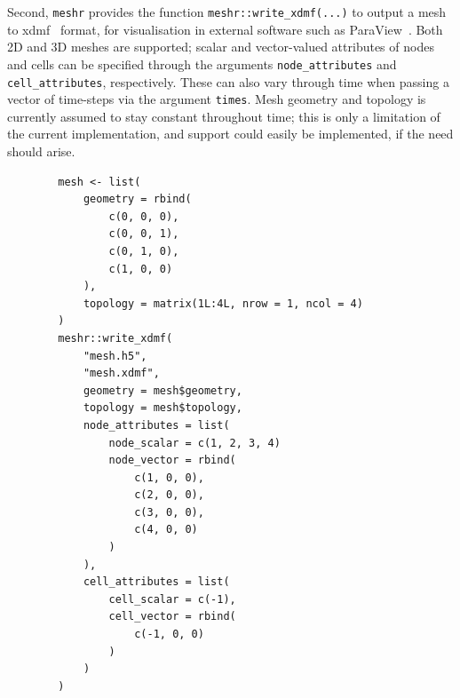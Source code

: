 \documentclass[british]{scrreprt}
\begin{document}
Second, \texttt{meshr} provides the function \texttt{meshr::write_xdmf(...)} to output a mesh to \gls{xdmf}~\cite{XDMF} format, for visualisation in external software such as ParaView~\cite{ParaView}. Both 2D and 3D meshes are supported; scalar and vector-valued attributes of nodes and cells can be specified through the arguments \texttt{node\_attributes} and \texttt{cell\_attributes}, respectively. These can also vary through time when passing a vector of time-steps via the argument \texttt{times}. Mesh geometry and topology is currently assumed to stay constant throughout time; this is only a limitation of the current implementation, and support could easily be implemented, if the need should arise.
\begin{listing}
    \begin{verbatim}
        mesh <- list(
            geometry = rbind(
                c(0, 0, 0),
                c(0, 0, 1),
                c(0, 1, 0),
                c(1, 0, 0)
            ),
            topology = matrix(1L:4L, nrow = 1, ncol = 4)
        )
        meshr::write_xdmf(
            "mesh.h5",
            "mesh.xdmf",
            geometry = mesh$geometry,
            topology = mesh$topology,
            node_attributes = list(
                node_scalar = c(1, 2, 3, 4)
                node_vector = rbind(
                    c(1, 0, 0),
                    c(2, 0, 0),
                    c(3, 0, 0),
                    c(4, 0, 0)
                )
            ),
            cell_attributes = list(
                cell_scalar = c(-1),
                cell_vector = rbind(
                    c(-1, 0, 0)
                )
            )
        )
    \end{verbatim}
    \caption{Example of outputting of a \gls{xdmf} file, in three spatial dimensions, without time. \texttt{"mesh.h5"} and \texttt{"mesh.xdmf"} are the names of the files generated\textemdash{}the former is a \gls{hdf5}~\cite{HDF5LibraryFile} file containing the data, the latter a \gls{xdmf}~\cite{XDMF} file describing the former. The names of the elements of \texttt{node\_attributes} and \texttt{cell\_attributes} specify what the attribute will be called in ParaView~\cite{ParaView}. Values must be specified for each node or element; therefore, scalar attributes must have length \( N \), and vector-valued attributes must be \( (N \times d) \) matrices, where \( N \) is the number of nodes or elements, and \( d \) is the number of spatial dimensions (this is a limitation of the visualisation software, which can only display vectors of the same dimension as the mesh).}
    \label{lst:write-xdmf}
\end{listing}
\end{document}
